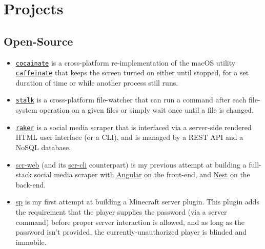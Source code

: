 \documentclass[a4paper, 10pt, roman, colorlinks, linkcolor=purple, filecolor=purple, citecolor=blue, urlcolor=blue]{moderncv}
\begin{document}
	\section{Projects}
	\subsection{Open-Source}
	\begin{itemize}
		\item \href{https://github.com/AppleGamer22/cocainate}{\texttt{cocainate}} is a cross-platform re-implementation of the macOS utility \href{https://github.com/apple-oss-distributions/PowerManagement/tree/main/caffeinate}{\texttt{caffeinate}} that keeps the screen turned on either until stopped, for a set duration of time or while another process still runs.
		\item \href{https://github.com/AppleGamer22/stalk}{\texttt{stalk}} is a cross-platform file-watcher that can run a command after each file-system operation on a given files or simply wait once until a file is changed.
		\item \href{https://github.com/AppleGamer22/raker}{\texttt{raker}} is a social media scraper that is interfaced via a server-side rendered HTML user interface (or a CLI), and is managed by a REST API and a NoSQL database.
		\item \href{https://github.com/AppleGamer22/scr-web}{scr-web} (and its \href{https://github.com/AppleGamer22/scr-cli}{scr-cli} counterpart) is my previous attempt at building a full-stack social media scraper with \href{https://angular.io}{Angular} on the front-end, and \href{https://nestjs.com}{Nest} on the back-end.
		\item \href{https://github.com/AppleGamer22/sp}{sp} is my first attempt at building a Minecraft server plugin. This plugin adds the requirement that the player supplies the password (via a server command) before proper server interaction is allowed, and as long as the password isn't provided, the currently-unauthorized player is blinded and immobile.
	\end{itemize}
\end{document}
